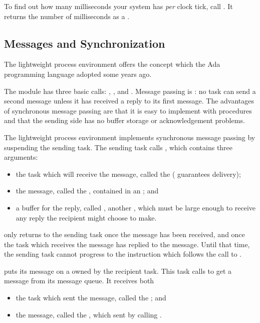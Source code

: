 To find out how many milliseconds your system has {\em per\/} clock tick,
call .  It returns the number of milliseconds as a
.

\subsection{Messages and Synchronization}

The lightweight process environment offers the  concept
which the Ada programming language adopted some years ago.

The module  has three basic calls: ,
, and .  Message passing is :
no task can send a second message unless it has received a reply to its first
message.  The advantages of synchronous message passing are that it is easy
to implement with procedures and that the sending side has no buffer storage
or acknowledgement problems.

The lightweight process environment implements synchronous message passing
by suspending the sending task.  The sending task calls ,
which contains three arguments:
\begin{itemize}
\item
 the task which will receive the message, called the 
  ( guarantees delivery);
\item
 the message, called the , contained in an ; and
\item
 a buffer for the reply, called , another , which must be large enough to receive any reply the
 recipient might choose to make.
\end{itemize}

 only returns to the sending task once the message has been
received, and once the task which receives the message has replied to
the message.  Until that time, the sending task cannot progress to the
instruction which follows the call to .

 puts its message on a  owned by the
recipient task.  This task calls  to get a message from
its message queue.  It receives both
\begin{itemize}
\item
 the task which sent the message, called the ; and
\item
 the message, called the , which  sent
 by calling .
\end{itemize}

